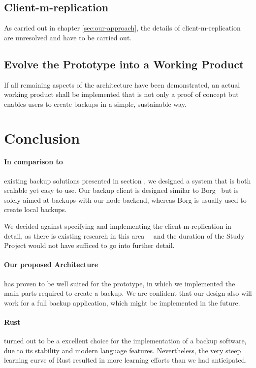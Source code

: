 \subsection{Client-m-replication}
As carried out in chapter \ref{sec:our-approach}, the details of \gls{client-m-replication} are unresolved and have to be carried out.

\subsection{Evolve the Prototype into a Working Product}
If all remaining aspects of the architecture have been demonstrated, an actual working product shall be implemented that is not only a proof of concept but enables users to create backups in a simple, sustainable way.

\section{Conclusion}
\paragraph{In comparison to}
existing backup solutions presented in section , we designed a system that is both scalable yet easy to use. Our backup \gls{client} is designed similar to Borg~\cite{borg-backup} but is solely aimed at backups with our \gls{node}-backend, whereas Borg is usually used to create local backups.

We decided against specifying and implementing the \gls{client-m-replication} in detail, as there is existing research in this area~\cite{p2p-redundancy}~\cite{p2p-scheduling} and the duration of the Study Project would not have sufficed to go into further detail.

\paragraph{Our proposed Architecture}
has proven to be well suited for the prototype, in which we implemented the main parts required to create a backup. We are confident that our design also will work for a full backup application, which might be implemented in the future.

\paragraph{Rust}
turned out to be a excellent choice for the implementation of a backup software, due to its stability and modern language features.
Nevertheless, the very steep learning curve of Rust resulted in more learning efforts than we had anticipated.

